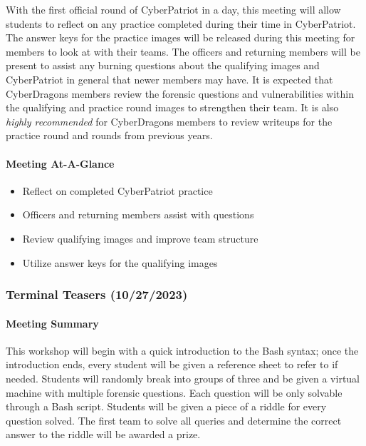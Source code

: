 \documentclass[
  letterpaper,
  DIV=11,
  numbers=noendperiod]{scrartcl}
\let\oldparagraph\paragraph
\renewcommand{\paragraph}[1]{\oldparagraph{#1}\mbox{}}
\providecommand{\tightlist}{%
  \setlength{\itemsep}{0pt}\setlength{\parskip}{0pt}}\usepackage{longtable,booktabs,array}
\begin{document}
With the first official round of CyberPatriot in a day, this meeting
will allow students to reflect on any practice completed during their
time in CyberPatriot. The answer keys for the practice images will be
released during this meeting for members to look at with their teams.
The officers and returning members will be present to assist any burning
questions about the qualifying images and CyberPatriot in general that
newer members may have. It is expected that CyberDragons members review
the forensic questions and vulnerabilities within the qualifying and
practice round images to strengthen their team. It is also \emph{highly
recommended} for CyberDragons members to review writeups for the
practice round and rounds from previous years.

\hypertarget{meeting-at-a-glance-5}{%
\paragraph{Meeting At-A-Glance}\label{meeting-at-a-glance-5}}

\begin{itemize}
\tightlist
\item
  Reflect on completed CyberPatriot practice
\item
  Officers and returning members assist with questions
\item
  Review qualifying images and improve team structure
\item
  Utilize answer keys for the qualifying images
\end{itemize}

\newpage{}

\hypertarget{terminal-teasers-10272023}{%
\subsubsection{Terminal Teasers
(10/27/2023)}\label{terminal-teasers-10272023}}

\hypertarget{meeting-summary-6}{%
\paragraph{Meeting Summary}\label{meeting-summary-6}}

This workshop will begin with a quick introduction to the Bash syntax;
once the introduction ends, every student will be given a reference
sheet to refer to if needed. Students will randomly break into groups of
three and be given a virtual machine with multiple forensic questions.
Each question will be only solvable through a Bash script. Students will
be given a piece of a riddle for every question solved. The first team
to solve all queries and determine the correct answer to the riddle will
be awarded a prize.
\end{document}
